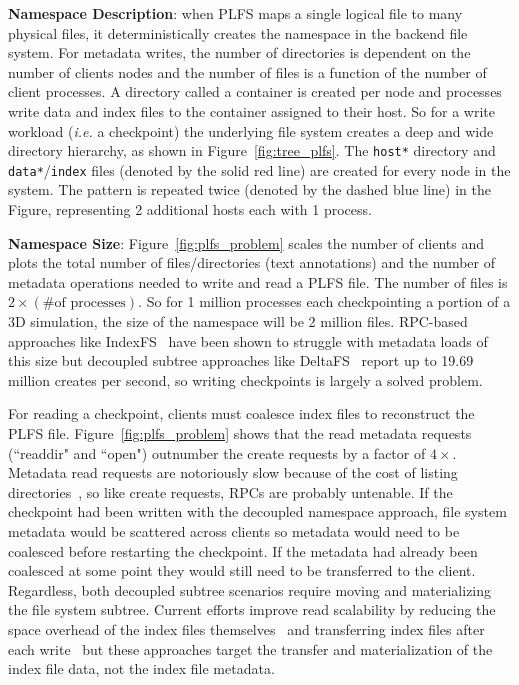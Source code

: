 
\textbf{Namespace Description}: when PLFS maps a single logical file to many
physical files, it deterministically creates the namespace in the backend file
system.  For metadata writes, the number of directories is dependent on the
number of clients nodes and the number of files is a function of the number of
client processes.  A directory called a container is created per node and
processes write data and index files to the container assigned to their host.
So for a write workload ({\it i.e.} a checkpoint) the underlying file system
creates a deep and wide directory hierarchy, as shown in
Figure~\ref{fig:tree_plfs}.  The \texttt{host*} directory and
\texttt{data*}/\texttt{index} files (denoted by the solid red line) are created
for every node in the system. The pattern is repeated twice (denoted by the
dashed blue line) in the Figure, representing 2 additional hosts each with 1
process.

\textbf{Namespace Size}: Figure~\ref{fig:plfs_problem} scales the number of
clients and plots the total number of files/directories (text annotations) and
the number of metadata operations needed to write and read a PLFS file.  The
number of files is \(2\times(\text{\# of processes})\).  So for 1 million
processes each checkpointing a portion of a 3D simulation, the size of the
namespace will be 2 million files.  RPC-based approaches like
IndexFS~\cite{ren:sc2014-indexfs} have been shown to struggle with metadata
loads of this size but decoupled subtree approaches like
DeltaFS~\cite{zheng:pdsw2015-deltafs} report up to 19.69 million creates per
second, so writing checkpoints is largely a solved problem.

For reading a checkpoint, clients must coalesce index files to reconstruct the
PLFS file. Figure~\ref{fig:plfs_problem} shows that the read metadata requests
(``readdir" and ``open") outnumber the create requests by a factor of
\(4\times\). Metadata read requests are notoriously
slow because of the cost of listing directories~\cite{carns:ipdps09-pvfs, eshel:fast10-panache}, so like create requests,
RPCs are probably untenable. If the checkpoint had been written with the
decoupled namespace approach, file system metadata would be scattered across
clients so metadata would need to be coalesced before restarting the
checkpoint. If the metadata had already been coalesced at some point they would
still need to be transferred to the client. Regardless, both decoupled
subtree scenarios require moving and materializing the file system subtree.
Current efforts improve read scalability by reducing the space overhead of the
index files themselves~\cite{he:hpdc13-plfs-patterns} and transferring index
files after each write~\cite{grider:pc17-diddlings} but these approaches target
the transfer and materialization of the index file data, not the index file
metadata.

